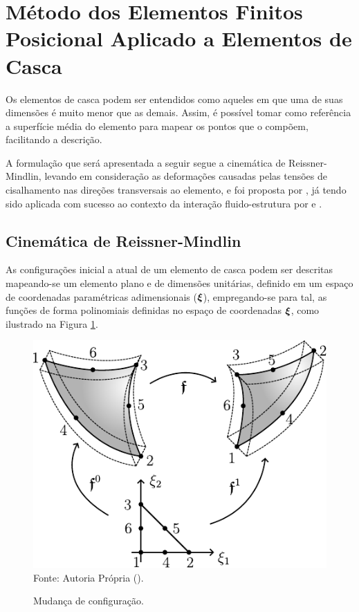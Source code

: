 
\section{Método dos Elementos Finitos Posicional Aplicado a Elementos de Casca} \label{MEFP}

Os elementos de casca podem ser entendidos como aqueles em que uma de suas dimensões é muito menor que as demais. Assim, é possível tomar como referência a superfície média do elemento para mapear os pontos que o compõem, facilitando a descrição.

A formulação que será apresentada a seguir segue a cinemática de Reissner-Mindlin, levando em consideração as deformações causadas pelas tensões de cisalhamento nas direções transversais ao elemento, e foi proposta por , já tendo sido aplicada com sucesso ao contexto da interação fluido-estrutura por  e .

\subsection{Cinemática de Reissner-Mindlin}

As configurações inicial a atual de um elemento de casca podem ser descritas mapeando-se um elemento plano e de dimensões unitárias, definido em um espaço de coordenadas paramétricas adimensionais ($\boldsymbol{\xi}$), empregando-se para tal, as funções de forma polinomiais definidas no espaço de coordenadas $\boldsymbol{\xi}$, como ilustrado na Figura \ref{fig:Mapeamento}.

\begin{figure}[h!]
    \centering
    \caption{Mudança de configuração.}
    \includegraphics[width=.4\linewidth]{Figuras/Mapeamento.pdf}
    \\Fonte: Autoria Própria (\the\year).
    \label{fig:Mapeamento}
\end{figure}

